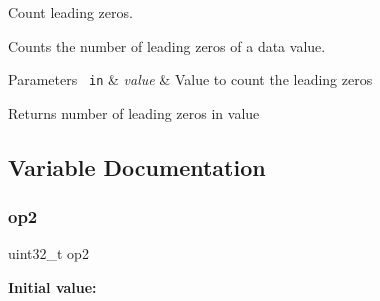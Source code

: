 Count leading zeros. 

Counts the number of leading zeros of a data value. 
\begin{DoxyParams}[1]{Parameters}
\mbox{\texttt{ in}}  & {\em value} & Value to count the leading zeros \\
\hline
\end{DoxyParams}
\begin{DoxyReturn}{Returns}
number of leading zeros in value 
\end{DoxyReturn}


\subsection{Variable Documentation}
\mbox{\label{group__CMSIS__Core__InstructionInterface_gadb2bb33809b6f35ba4d176cbec7c7b75}} 
\subsubsection{\texorpdfstring{op2}{op2}}
{\footnotesize\ttfamily uint32\+\_\+t op2}

{\bfseries Initial value\+:}
\begin{DoxyCode}{0}
\DoxyCodeLine{\{}

\end{DoxyCode}
